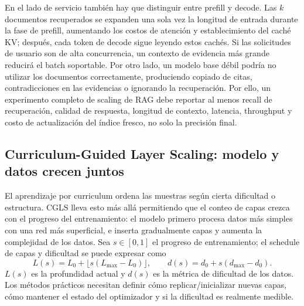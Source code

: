 En el lado de servicio también hay que distinguir entre prefill y decode. Las $k$ documentos recuperados se expanden una sola vez la longitud de entrada durante la fase de prefill, aumentando los costos de atención y establecimiento del caché KV; después, cada token de decode sigue leyendo estos cachés. Si las solicitudes de usuario son de alta concurrencia, un contexto de evidencia más grande reducirá el batch soportable. Por otro lado, un modelo base débil podría no utilizar los documentos correctamente, produciendo copiado de citas, contradicciones en las evidencias o ignorando la recuperación. Por ello, un experimento completo de scaling de RAG debe reportar al menos recall de recuperación, calidad de respuesta, longitud de contexto, latencia, throughput y costo de actualización del índice fresco, no solo la precisión final.

\subsection{Curriculum-Guided Layer Scaling: modelo y datos crecen juntos}

El aprendizaje por curriculum ordena las muestras según cierta dificultad o estructura. CGLS lleva esto más allá permitiendo que el conteo de capas crezca con el progreso del entrenamiento: el modelo primero procesa datos más simples con una red más superficial, e inserta gradualmente capas y aumenta la complejidad de los datos. Sea $s\in[0,1]$ el progreso de entrenamiento; el schedule de capas y dificultad se puede expresar como
\[
L(s)=L_0+\lfloor s(L_{\max}-L_0)\rfloor,
\qquad d(s)=d_0+s(d_{\max}-d_0).
\]
$L(s)$ es la profundidad actual y $d(s)$ es la métrica de dificultad de los datos. Los métodos prácticos necesitan definir cómo replicar/inicializar nuevas capas, cómo mantener el estado del optimizador y si la dificultad es realmente medible.





